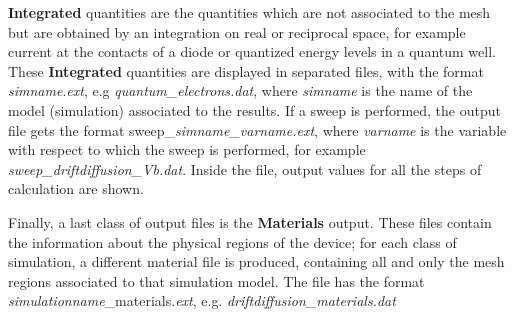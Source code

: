 \textbf{Integrated}  quantities are the  quantities which  are  not  associated to the  mesh but  are obtained by an integration on real or reciprocal space,  for  example  current at the  contacts of  a  diode or  quantized energy levels  in  a  quantum  well.
These \textbf{Integrated}  quantities  are displayed in separated files,  with the  format \textit{simname}.\textit{ext}, 
 e.g  \textit{quantum\_electrons.dat},  where \textit{simname} is  the  name of the model (simulation) associated to the  results. 
%
 If  a  sweep  is  performed,  the output  file gets the  format   sweep\_\textit{simname\_varname.ext},
where  \textit{varname} is the variable  with respect to  which the  sweep is  performed, for example    \textit{sweep\_driftdiffusion\_Vb.dat}.
Inside the  file,   output values for all  the  steps  of  calculation are shown.

Finally,  a  last class of  output files is  the  \textbf{Materials}  output. These  files  contain the information about   the physical regions of  the  device;  for  each  class  of  simulation, a  different material file is  produced, containing  all and  only the  mesh regions associated to that simulation model. The  file has the  format  \textit{simulationname}\_materials.\textit{ext},   e.g.
\textit{driftdiffusion\_materials.dat }




